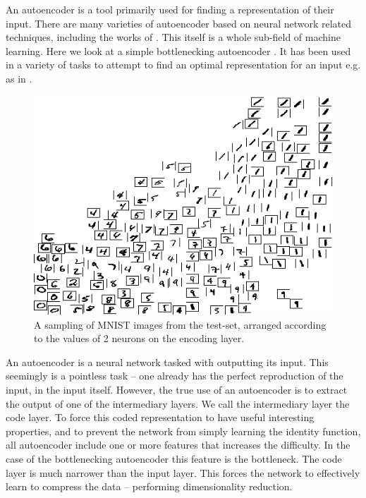 \documentclass[12pt,parskip]{komatufte}
\begin{document}
An autoencoder is a tool primarily used for finding a representation of their input.
There are many varieties of autoencoder based on neural network related techniques, including the works of \textcite{hinton2002RBM,hinton2006reducing,hinton2006fastDBN,vincent2010stacked,ICML2012Chen_416,2014VAE}.
This itself is a whole sub-field of machine learning.
Here we look at a simple bottlenecking autoencoder
\parencite{bourlard1988auto,japkowicz2000nonlinear}.
It has been used in a variety of tasks to attempt to find an optimal representation for an input e.g. as in .
\begin{figure}
	\caption{A sampling of MNIST images from the test-set, arranged according to the values of 2 neurons on the encoding layer.}
	\label{mnist-encoding}
	\includegraphics[width=\textwidth]{figs/chapterintromachinelearning/mnist-encoding.png}
\end{figure}
An autoencoder is a neural network tasked with outputting its input.
This seemingly is a pointless task -- one already has the perfect reproduction of the input, in the input itself.
However, the true use of an autoencoder is to extract the output of one of the intermediary layers.
We call the intermediary layer the code layer.
To force this coded representation to have useful interesting properties,
and to prevent the network from simply learning the identity function,
all autoencoder include one or more features that increases the difficulty.
In the case of the bottlenecking autoencoder this feature is the bottleneck.
The code layer is much narrower than the input layer.
This forces the network to effectively learn to compress the data -- performing dimensionality reduction.
\end{document}
